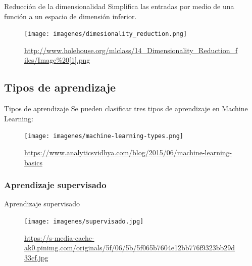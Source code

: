\documentclass[hyperref={unicode}]{beamer}
\begin{document}
\begin{frame}{Reducción de la dimensionalidad}
	Simplifica las entradas por medio de una función a un espacio de dimensión inferior.
	
	\begin{figure}
			\begin{center}
			\texttt{[image: imagenes/dimesionality\_reduction.png]}
			\caption{\url{http://www.holehouse.org/mlclass/14_Dimensionality_Reduction_files/Image\%20[1].png}}
			\end{center}
	\end{figure}
			
\end{frame}


\subsection{Tipos de aprendizaje}
\begin{frame}{Tipos de aprendizaje}
	Se pueden clasificar tres tipos de aprendizaje en Machine Learning:
		
	\begin{figure}
				\begin{center}
				\texttt{[image: imagenes/machine-learning-types.png]}
				\caption{\url{https://www.analyticsvidhya.com/blog/2015/06/machine-learning-basics}}
				\end{center}
		\end{figure}
\end{frame}

\subsubsection{Aprendizaje supervisado}
\begin{frame}{Aprendizaje supervisado}

	\begin{figure}
					\begin{center}
					\texttt{[image: imagenes/supervisado.jpg]}
					\caption{\url{https://s-media-cache-ak0.pinimg.com/originals/5f/06/5b/5f065b7604e12bb776f9323bb29d33cf.jpg}}
					\end{center}
			\end{figure}

\end{frame}
\end{document}
